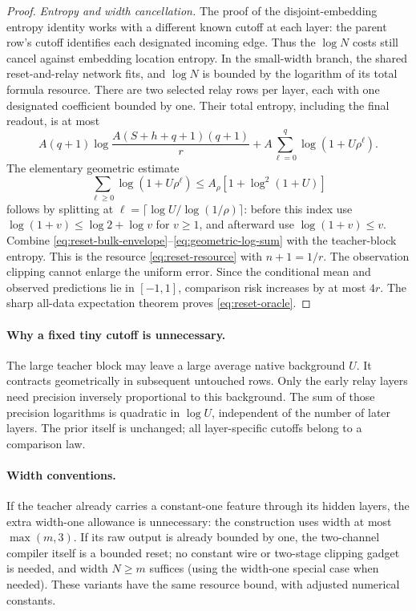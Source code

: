 \begin{proof}
\emph{Entropy and width cancellation.}
The proof of the disjoint-embedding entropy identity works with a
different known cutoff at each layer: the parent row's cutoff
identifies each designated incoming edge. Thus the $\log N$ costs
still cancel against embedding location entropy. In the small-width
branch, the shared reset-and-relay network fits, and $\log N$ is
bounded by the logarithm of its total formula resource.
There are two selected relay rows per layer, each with one designated
coefficient bounded by one. Their total entropy, including the final
readout, is at most
\begin{equation}
 A(q+1)\log\frac{A(S+h+q+1)(q+1)}r
       +A\sum_{\ell=0}^{q}\log(1+U\rho^\ell).
 \label{eq:relay-entropy-sum}
\end{equation}
The elementary geometric estimate
\begin{equation}
 \sum_{\ell\ge0}\log(1+U\rho^\ell)
       \le A_\rho[1+\log^2(1+U)]
 \label{eq:geometric-log-sum}
\end{equation}
follows by splitting at
$\ell=\lceil\log U/\log(1/\rho)\rceil$: before this index use
$\log(1+v)\le\log2+\log v$ for $v\ge1$, and afterward use
$\log(1+v)\le v$. Combine
\eqref{eq:reset-bulk-envelope}--\eqref{eq:geometric-log-sum}
with the teacher-block entropy. This is the resource
\eqref{eq:reset-resource} with $n+1=1/r$.
The observation clipping cannot enlarge the uniform error. Since
the conditional mean and observed predictions lie in $[-1,1]$,
comparison risk increases by at most $4r$. The sharp all-data
expectation theorem proves \eqref{eq:reset-oracle}.
\end{proof}

\paragraph{Why a fixed tiny cutoff is unnecessary.}
The large teacher block may leave a large average native background
$U$. It contracts geometrically in subsequent untouched rows. Only
the early relay layers need precision inversely proportional to this
background. The sum of those precision logarithms is quadratic in
$\log U$, independent of the number of later layers. The prior itself
is unchanged; all layer-specific cutoffs belong to a comparison law.


\paragraph{Width conventions.}
If the teacher already carries a constant-one feature through its
hidden layers, the extra width-one allowance is unnecessary: the
construction uses width at most $\max(m,3)$. If its raw output is
already bounded by one, the two-channel compiler itself is a bounded
reset; no constant wire or two-stage clipping gadget is needed, and
width $N\ge m$ suffices (using the width-one special case when needed).
These variants have the same resource bound, with adjusted numerical
constants.
